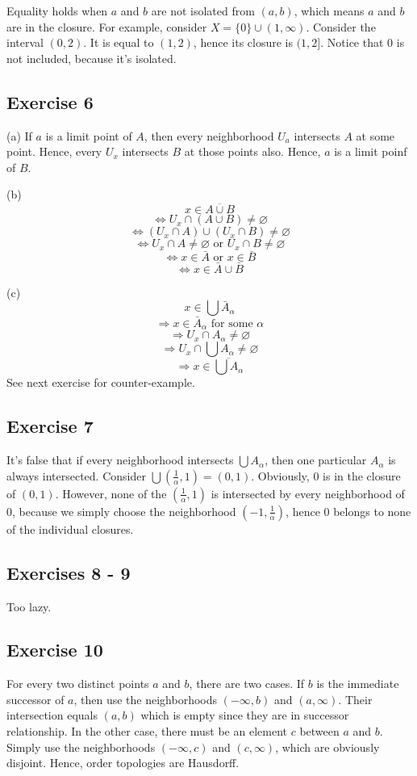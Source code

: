 \documentclass{book}
\begin{document}
Equality holds when $a$ and $b$ are not isolated from $(a, b)$, which means $a$ and $b$ are in the closure. For example, consider $X = \{ 0 \} \cup (1, \infty)$. Consider the interval $(0, 2)$. It is equal to $(1, 2)$, hence its closure is $(1, 2]$. Notice that $0$ is not included, because it's isolated.

\subsection*{Exercise 6}
(a)
If $a$ is a limit point of $A$, then every neighborhood $U_a$ intersects $A$ at some point. Hence, every $U_x$ intersects $B$ at those points also. Hence, $a$ is a limit poinf of $B$.

\noindent
(b)
$$x \in \overline{A \cup B}$$
$$\Leftrightarrow U_x \cap (A \cup B) \neq \varnothing$$
$$\Leftrightarrow (U_x \cap A) \cup (U_x \cap B) \neq \varnothing$$
$$\Leftrightarrow U_x \cap A \neq \varnothing \text{ or } U_x \cap B \neq \varnothing$$
$$\Leftrightarrow x \in \bar{A} \text{ or } x \in \bar{B}$$
$$\Leftrightarrow x \in \bar{A} \cup \bar{B}$$

\noindent
(c)
$$x \in \bigcup \bar{A}_\alpha$$
$$\Rightarrow x \in \bar{A}_\alpha \text{ for some } \alpha$$
$$\Rightarrow U_x \cap A_\alpha \neq \varnothing$$
$$\Rightarrow U_x \cap \bigcup A_\alpha \neq \varnothing$$
$$\Rightarrow x \in \overline{\bigcup A_\alpha}$$
See next exercise for counter-example.

\subsection*{Exercise 7}
It's false that if every neighborhood intersects $\bigcup A_\alpha$, then one particular $A_\alpha$ is always intersected. Consider $\bigcup (\frac{1}{\alpha}, 1) = (0, 1)$. Obviously, $0$ is in the closure of $(0, 1)$. However, none of the $(\frac{1}{\alpha}, 1)$ is intersected by every neighborhood of $0$, because we simply choose the neighborhood $(-1, \frac{1}{\alpha})$, hence $0$ belongs to none of the individual closures.

\subsection*{Exercises 8 - 9}
Too lazy.

\subsection*{Exercise 10}
For every two distinct points $a$ and $b$, there are two cases. If $b$ is the immediate successor of $a$, then use the neighborhoods $(-\infty, b)$ and $(a, \infty)$. Their intersection equals $(a, b)$ which is empty since they are in successor relationship. In the other case, there must be an element $c$ between $a$ and $b$. Simply use the neighborhoods $(-\infty, c)$ and $(c, \infty)$, which are obviously disjoint. Hence, order topologies are Hausdorff.
\end{document}
